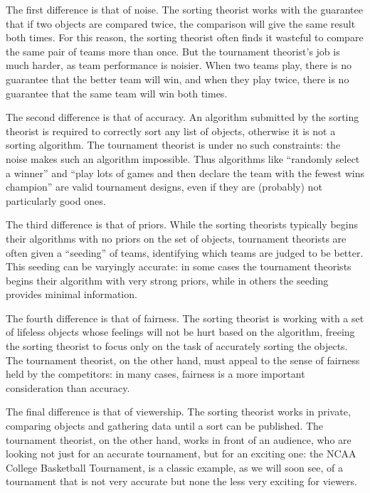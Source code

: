 {    The first difference is that of noise. The sorting theorist works with the guarantee that if two objects are compared twice, the comparison will give the same result both times. For this reason, the sorting theorist often finds it wasteful to compare the same pair of teams more than once. But the tournament theorist's job is much harder, as team performance is noisier. When two teams play, there is no guarantee that the better team will win, and when they play twice, there is no guarantee that the same team will win both times.

    The second difference is that of accuracy. An algorithm submitted by the sorting theorist is required to correctly sort any list of objects, otherwise it is not a sorting algorithm. The tournament theorist is under no such constraints: the noise makes such an algorithm impossible. Thus algorithms like ``randomly select a winner'' and ``play lots of games and then declare the team with the fewest wins champion'' are valid tournament designs, even if they are (probably) not particularly good ones.

    The third difference is that of priors. While the sorting theorists typically begins their algorithms with no priors on the set of objects, tournament theorists are often given a ``seeding'' of teams, identifying which teams are judged to be better. This seeding can be varyingly accurate: in some cases the tournament theorists begins their algorithm with very strong priors, while in others the seeding provides minimal information.

    The fourth difference is that of fairness. The sorting theorist is working with a set of lifeless objects whose feelings will not be hurt based on the algorithm, freeing the sorting theorist to focus only on the task of accurately sorting the objects. The tournament theorist, on the other hand, must appeal to the sense of fairness held by the competitors: in many cases, fairness is a more important consideration than accuracy. 
    
    The final difference is that of viewership. The sorting theorist works in private, comparing objects and gathering data until a sort can be published. The tournament theorist, on the other hand, works in front of an audience, who are looking not just for an accurate tournament, but for an exciting one: the NCAA College Basketball Tournament, is a classic example, as we will soon see, of a tournament that is not very accurate but none the less very exciting for viewers.

}
